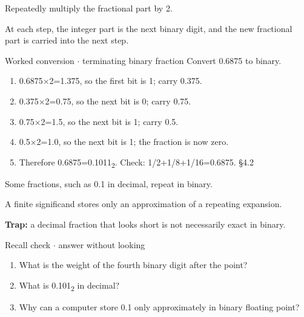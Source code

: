 \documentclass[11pt]{article}
\begin{document}
\begin{keepsection}
\begin{keepsection}
Repeatedly multiply the fractional part by 2.

At each step, the integer part is the next binary digit, and the new fractional part is carried into the next step.

\begin{workedbox}{Worked conversion \ensuremath{\cdot} terminating binary fraction}
Convert 0.6875 to binary.

\begin{enumerate}
\item 0.6875\ensuremath{\times}2=1.375, so the first bit is 1; carry 0.375.
\item 0.375\ensuremath{\times}2=0.75, so the next bit is 0; carry 0.75.
\item 0.75\ensuremath{\times}2=1.5, so the next bit is 1; carry 0.5.
\item 0.5\ensuremath{\times}2=1.0, so the next bit is 1; the fraction is now zero.
\item Therefore 0.6875=0.1011\textsubscript{2}. Check: 1/2+1/8+1/16=0.6875. \hfill{\small\color{FAUblue}§4.2}
\end{enumerate}
\end{workedbox}

Some fractions, such as 0.1 in decimal, repeat in binary.

A finite significand stores only an approximation of a repeating expansion.

\begin{notebox}\textbf{Trap:} a decimal fraction that looks short is not necessarily exact in binary.\end{notebox}

\begin{recallbox}{Recall check \ensuremath{\cdot} answer without looking}
\begin{enumerate}
\item What is the weight of the fourth binary digit after the point?
\item What is 0.101\textsubscript{2} in decimal?
\item Why can a computer store 0.1 only approximately in binary floating point?
\end{enumerate}

\end{recallbox}
\end{keepsection}
\end{keepsection}
\end{document}
